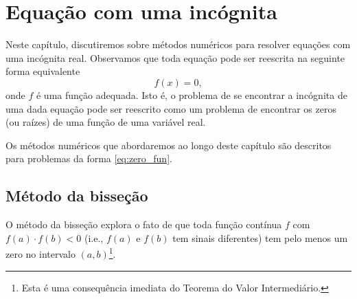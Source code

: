 
\chapter{Equação com uma incógnita}\label{cap_eq1d}
\thispagestyle{fancy}

Neste capítulo, discutiremos sobre métodos numéricos para resolver equações com uma incógnita real. Observamos que toda equação pode ser reescrita na seguinte forma equivalente
\begin{equation}\label{eq:zero_fun}
  f(x) = 0,
\end{equation}
onde $f$ é uma função adequada. Isto é, o problema de se encontrar a incógnita de uma dada equação pode ser reescrito como um problema de encontrar os zeros (ou raízes) de uma função de uma variável real.

Os métodos numéricos que abordaremos ao longo deste capítulo são descritos para problemas da forma \eqref{eq:zero_fun}.

\section{Método da bisseção}\label{cap_eq1d_sec_bissec}

O método da bisseção explora o fato de que toda função contínua $f$ com $f(a)\cdot f(b) < 0$ (i.e., $f(a)$ e $f(b)$ tem sinais diferentes) tem pelo menos um zero no intervalo $(a, b)$\footnote{Esta é uma consequência imediata do Teorema do Valor Intermediário.}.

